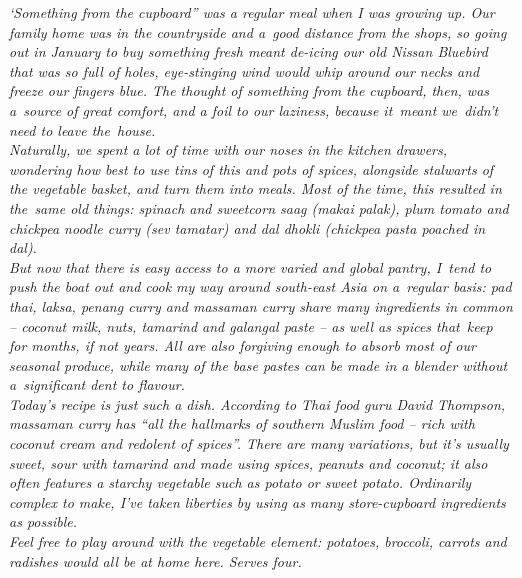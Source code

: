 \documentclass{book}
\begin{document}
\emph{‘Something from the cupboard” was a regular meal when I was growing up. Our family home was in the countryside and a good distance from the shops, so going out in January to buy something fresh meant de-icing our old Nissan Bluebird that was so full of holes, eye-stinging wind would whip around our necks and freeze our fingers blue. The thought of something from the cupboard, then, was a source of great comfort, and a foil to our laziness, because it meant we didn’t need to leave the house.\\ 
Naturally, we spent a lot of time with our noses in the kitchen drawers, wondering how best to use tins of this and pots of spices, alongside stalwarts of the vegetable basket, and turn them into meals. Most of the time, this resulted in the same old things: spinach and sweetcorn saag (makai palak), plum tomato and chickpea noodle curry (sev tamatar) and dal dhokli (chickpea pasta poached in dal).\\ 
But now that there is easy access to a more varied and global pantry, I tend to push the boat out and cook my way around south-east Asia on a regular basis: pad thai, laksa, penang curry and massaman curry share many ingredients in common – coconut milk, nuts, tamarind and galangal paste – as well as spices that keep for months, if not years. All are also forgiving enough to absorb most of our seasonal produce, while many of the base pastes can be made in a blender without a significant dent to flavour.\\ 
Today’s recipe is just such a dish. According to Thai food guru David Thompson, massaman curry has “all the hallmarks of southern Muslim food – rich with coconut cream and redolent of spices”. There are many variations, but it’s usually sweet, sour with tamarind and made using spices, peanuts and coconut; it also often features a starchy vegetable such as potato or sweet potato. Ordinarily complex to make, I’ve taken liberties by using as many store-cupboard ingredients as possible.\\ 
Feel free to play around with the vegetable element: potatoes, broccoli, carrots and radishes would all be at home here. Serves four.}\\\\ 
\end{document}
